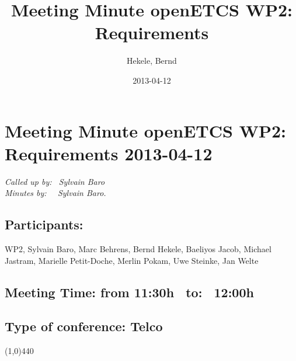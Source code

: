 \documentclass[a4paper]{article}
\title{Meeting Minute openETCS WP2: Requirements}
\author{Hekele, Bernd}
\date{2013-04-12}
\begin{document}
\section*{\large{Meeting Minute openETCS WP2: Requirements 2013-04-12}}

\emph{Called up by: \ Sylvain Baro}\\
\emph{Minutes by: \ \  Sylvain Baro.}

\subsection*{Participants:} WP2, 
Sylvain Baro,
Marc Behrens, 
Bernd Hekele,
Baeliyos Jacob,
Michael Jastram, 
Marielle Petit-Doche, 
Merlin Pokam,
Uwe Steinke,
Jan Welte\\


\subsection*{Meeting Time: from 11:30h \ to: \ 12:00h}

\subsection*{Type of conference: Telco}

\line(1,0){440}
\end{document}
